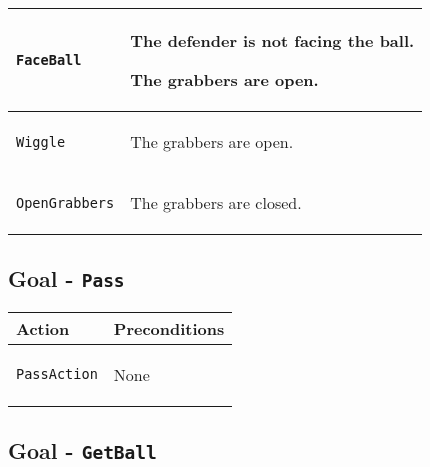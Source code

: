 \begin{center}
\begin{tabular}{ | >{\centering\arraybackslash}m{42mm} | >{\centering\arraybackslash}p{110mm} | }
\texttt{FaceBall} &
\begin{compactitem}
\item The defender is not facing the ball.
\item The grabbers are open.
\end{compactitem}  \\ \hline

\texttt{Wiggle} &
\begin{compactitem}
\item The grabbers are open.
\end{compactitem}  \\ \hline

\texttt{OpenGrabbers} &
\begin{compactitem}
\item The grabbers are closed.
\end{compactitem}  \\ \hline
\end{tabular}
\par
\bigskip

\end{center}


\subsection{Goal - \texttt{Pass}}

\begin{center}

\renewcommand{\arraystretch}{1.5}
\begin{tabular}{ | >{\centering\arraybackslash}m{42mm} | >{\centering\arraybackslash}p{110mm} | }
\hline
\textbf{Action} & \textbf{Preconditions} \\ \hline
\texttt{PassAction} &
\begin{compactitem}
\item None
\end{compactitem}  \\ \hline

\end{tabular}
\par
\bigskip

\end{center}


\pagebreak
\subsection{Goal - \texttt{GetBall}}

